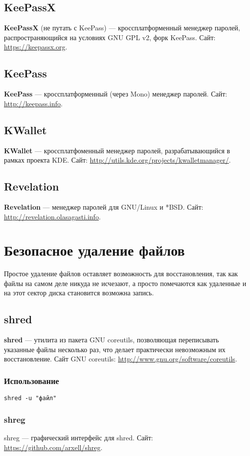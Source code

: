 \subsection{KeePassX}
\textbf{KeePassX} (не путать с KeePass) --- кроссплатформенный менеджер паролей, распространяющийся на условиях GNU GPL v2, форк KeePass. Сайт: \url{https://keepassx.org}.
\subsection{KeePass}
\textbf{KeePass} --- кроссплатформенный (через Mono) менеджер паролей. Сайт: \url{http://keepass.info}.
\subsection{KWallet}
\textbf{KWallet} --- кроссплатфоменный менеджер паролей, разрабатывающийся в рамках проекта KDE. Сайт: \url{http://utils.kde.org/projects/kwalletmanager/}.
\subsection{Revelation}
\textbf{Revelation} --- менеджер паролей для GNU/Linux и *BSD. Сайт: \url{http://revelation.olasagasti.info}.

\section{Безопасное удаление файлов}
\begin{important}
Простое удаление файлов оставляет возможность для восстановления, так как файлы на самом деле никуда не исчезают, а просто помечаются как удаленные и на этот сектор диска становится возможна запись.
\end{important}
\subsection{shred}
\textbf{shred} --- утилита из пакета GNU coreutils, позволяющая переписывать указанные файлы несколько раз, что делает практически невозможным их восстановление. Сайт GNU coreutils: \url{http://www.gnu.org/software/coreutils}.
\subsubsection{Использование}
\begin{lstlisting}
shred -u "файл"
\end{lstlisting}
\subsubsection{shreg}
shreg --- графический интерфейс для shred. Сайт: \url{https://github.com/arxell/shreg}.
